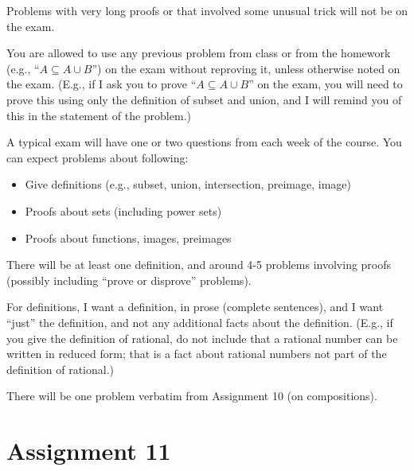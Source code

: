 \documentclass[12pt]{article}
\newcommand{\warning}{
\smallskip
\begin{center}
  {\color{red} {\huge\Stopsign} \hspace{1pt}  IN PROGRESS!} {\color{blue}Check back later for the final assignment.} {\color{red} {\huge\Stopsign} }
\end{center}
\smallskip
\AddToShipoutPictureBG*{\AtTextLowerLeft{\llap{\rotatebox[origin=lb]{90}{\large\sffamily\hspace{2.5in}
  {\color{red} {\huge\Stopsign} \hspace{1pt}  IN PROGRESS!} {\color{blue}Check back later for the final assignment.} {\color{red} {\huge\Stopsign} }
      }\quad\rule{0.8pt}{\textheight}\enspace}}}
}
\begin{document}
Problems with very long proofs or that involved some unusual trick will not be on the exam.
\smallskip

You are allowed to use any previous problem from class or from the homework (e.g., ``$A \subseteq A \cup B$'') on the exam without reproving it, unless otherwise noted on the exam. (E.g., if I ask you to prove ``$A \subseteq A \cup B$'' on the exam, you will need to prove this using only the definition of subset and union, and I will remind you of this in the statement of the problem.)
\smallskip

A typical exam will have one or two questions from each week of the course. You can expect problems about following:
\begin{itemize}
\item Give definitions (e.g., subset, union, intersection, preimage, image)
\item Proofs about sets (including power sets)
\item Proofs about functions, images, preimages
\end{itemize}
There will be at least one definition, and around 4-5 problems involving proofs (possibly including ``prove or disprove'' problems).
\smallskip


For definitions, I want a definition, in prose (complete sentences), and I want ``just'' the definition, and not any additional facts about the definition. (E.g., if you give the definition of rational, do not include that a rational number can be written in reduced form; that is a fact about rational numbers not part of the definition of rational.)
\smallskip

There will be one problem verbatim from Assignment 10 (on compositions).






 
\newpage
\section[11 (due \csname dateWeek11\endcsname): Inverse functions.]{Assignment 11}

\end{document}
